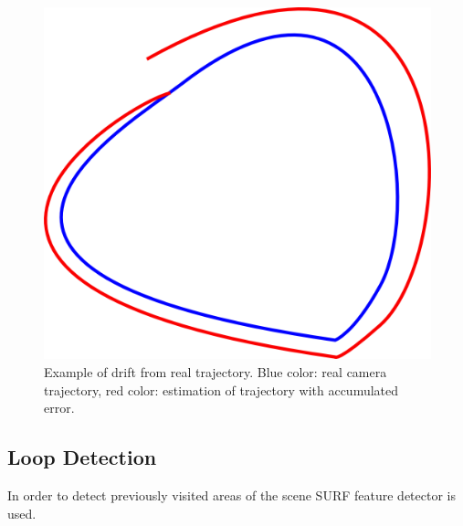 \begin{figure}[!h]
\begin{center}
\includegraphics[scale=0.35]{images/drift}
\caption{Example of drift from real trajectory. Blue color: real camera trajectory, red color: estimation of trajectory with accumulated error.}
\end{center}
\end{figure}

\subsection{Loop Detection}

In order to detect previously visited areas of the scene SURF \cite{Bay06surf} feature detector 
is used. 

